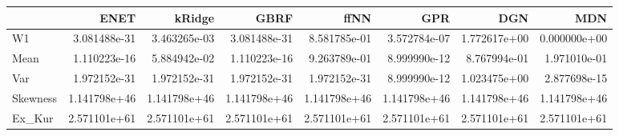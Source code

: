 \begin{tabular}{lrrrrrrr}
\toprule
{} &          ENET &        kRidge &          GBRF &          ffNN &           GPR &           DGN &           MDN \\
\midrule
W1       &  3.081488e-31 &  3.463265e-03 &  3.081488e-31 &  8.581785e-01 &  3.572784e-07 &  1.772617e+00 &  0.000000e+00 \\
Mean     &  1.110223e-16 &  5.884942e-02 &  1.110223e-16 &  9.263789e-01 &  8.999990e-12 &  8.767994e-01 &  1.971010e-01 \\
Var      &  1.972152e-31 &  1.972152e-31 &  1.972152e-31 &  1.972152e-31 &  8.999990e-12 &  1.023475e+00 &  2.877698e-15 \\
Skewness &  1.141798e+46 &  1.141798e+46 &  1.141798e+46 &  1.141798e+46 &  1.141798e+46 &  1.141798e+46 &  1.141798e+46 \\
Ex\_Kur   &  2.571101e+61 &  2.571101e+61 &  2.571101e+61 &  2.571101e+61 &  2.571101e+61 &  2.571101e+61 &  2.571101e+61 \\
\bottomrule
\end{tabular}
